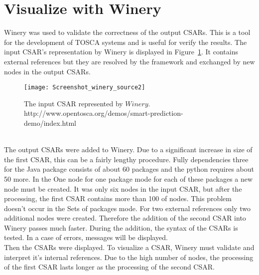 \section{Visualize with Winery}\label{sec:checkwin}
Winery was used to validate the correctness of the output CSARs. 
 This is a tool for the development of TOSCA systems and is useful for verify the results. %
 The input CSAR's representation by Winery is displayed in Figure~\ref{fig:winery_source2}.
 It contains external references but they are resolved by the framework and exchanged by new nodes in the output CSARs. 
 \begin{figure}[ht]   
 	\centering
 	\texttt{[image: Screenshot\_winery\_source2]}
 	\caption[The input CSAR represented by $Winery$.]{The input CSAR represented by $Winery$.\\\small http://www.opentosca.org/demos/smart-prediction-demo/index.html}
 	\label{fig:winery_source2}
 \end{figure}
   \\
 The output CSARs were added to Winery.
 Due to a significant increase in size of the first CSAR, this can be a fairly lengthy procedure.
Fully dependencies three for the Java package consists of about 60 packages and the python requires about 50 more. 
In the One node for one package mode for each of these packages a new node must be created.
It was only six nodes in the input CSAR, but after the processing, the first CSAR contains more than 100 of nodes.
This problem doesn't occur in the Sets of packages mode. 
For two external references only two additional nodes were created.
Therefore the addition of the second CSAR into Winery passes much faster. 
 During the addition, the syntax of the CSARs is tested.
 In a case of errors, messages will be displayed.
 \\
Then the CSARs were displayed.
To visualize a CSAR, Winery must validate and interpret it's internal references.
Due to the high number of nodes, the processing of the first CSAR lasts longer as the processing of the second CSAR. 
